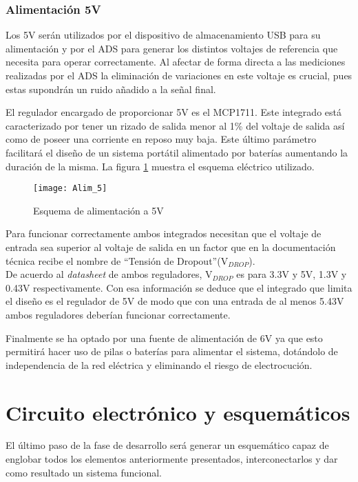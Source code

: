 \subsubsection{Alimentación 5V\label{sec:Alimentacion_5V}}

Los 5V serán utilizados por el dispositivo de almacenamiento USB para su alimentación y por el ADS para generar los distintos voltajes de referencia que necesita para operar correctamente. Al afectar de forma directa a las mediciones realizadas por el ADS la eliminación de variaciones en este voltaje es crucial, pues estas supondrán un ruido añadido a la señal final.

El regulador encargado de proporcionar 5V es el MCP1711. Este integrado está caracterizado por tener un rizado de salida menor al 1\% del voltaje de salida así como de poseer una corriente en reposo muy baja. Este último parámetro facilitará el diseño de un sistema portátil alimentado por baterías aumentando la duración de la misma. La figura \ref{fig:Alim_5} muestra el esquema eléctrico utilizado.

\begin{figure} [h]
    \centering
    \texttt{[image: Alim\_5]}
    \caption{Esquema de alimentación a 5V}
    \label{fig:Alim_5}
\end{figure}

Para funcionar correctamente ambos integrados necesitan que el voltaje de entrada sea superior al voltaje de salida en un factor que en la documentación técnica recibe el nombre de ``\gls{Tensión de Dropout}''(V$_{DROP}$).
\\De acuerdo al \textit{datasheet} de ambos reguladores, V$_{DROP}$ es para 3.3V y 5V, 1.3V y 0.43V respectivamente. Con esa información se deduce que el integrado que limita el diseño es el regulador de 5V de modo que con una entrada de al menos 5.43V ambos reguladores deberían funcionar correctamente.

Finalmente se ha optado por una fuente de alimentación de 6V ya que esto permitirá hacer uso de pilas o baterías para alimentar el sistema, dotándolo de independencia de la red eléctrica y eliminando el riesgo de electrocución.

\clearpage

\section{Circuito electrónico y esquemáticos\label{sec:Esquemáticos}}

El último paso de la fase de desarrollo será generar un esquemático capaz de englobar todos los elementos anteriormente presentados, interconectarlos y dar como resultado un sistema funcional.

